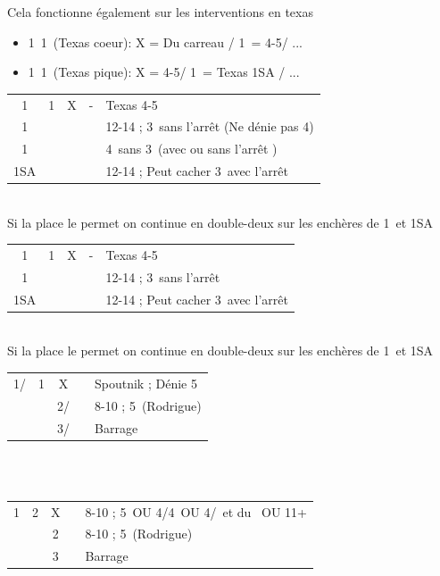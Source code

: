 \documentclass[a4paper, oneside, 11pt]{report}
\begin{document}
		Cela fonctionne également sur les interventions en texas
		\begin{itemize}
		\item 1\trefle\ 1\carreau\ (Texas coeur): X = Du carreau / 1\coeur\ = 4-5\pique / ...
		\item 1\trefle\ 1\coeur\ (Texas pique): X = 4-5\coeur / 1\pique\ = Texas 1SA / ...\\
		\end{itemize}

		\begin{tabular}{cccc|l}
		1\trefle & 1\carreau & X & - & Texas 4-5\coeur\\
		1\coeur &&&& 12-14 ; 3\coeur\ sans l'arrêt (Ne dénie pas 4\pique)\\
		1\pique &&&& 4\pique\ sans 3\coeur\ (avec ou sans l'arrêt \carreau)\\
		1SA &&&& 12-14 ; Peut cacher 3\coeur\ avec l'arrêt \carreau\\
		\end{tabular}\\
		
		Si la place le permet on continue en double-deux sur les enchères de 1\coeur\ et 1SA\\

		\begin{tabular}{cccc|l}
		1\trefle & 1\coeur & X & - & Texas 4-5\pique\\
		1\pique &&&& 12-14 ; 3\pique\ sans l'arrêt\\
		1SA &&&& 12-14 ; Peut cacher 3\pique\ avec l'arrêt \coeur\\
		\end{tabular}\\

		Si la place le permet on continue en double-deux sur les enchères de 1\pique\ et 1SA\\
		
		\begin{tabular}{cccc|l}
		1\trefle/\carreau & 1\pique & X && Spoutnik ; Dénie 5\coeur\\
		&& 2\trefle/\carreau && 8-10 ; 5\coeur\ (Rodrigue)\\
		&& 3\trefle/\carreau && Barrage\\
		\end{tabular}\\\\

		\begin{tabular}{cccc|l}
		1\carreau & 2\trefle & X && 8-10 ; 5\pique\ OU 4\coeur/4\pique\ OU 4\coeur/\pique\ et du \carreau\ OU 11+\\
		&& 2\carreau && 8-10 ; 5\coeur\ (Rodrigue)\\
		&& 3\carreau && Barrage\\
		\end{tabular}\\\\
\end{document}
